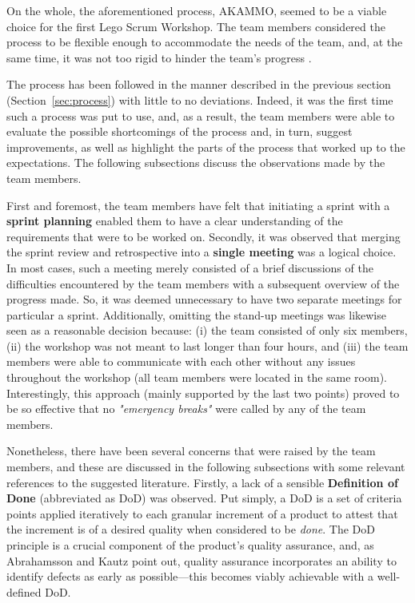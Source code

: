 \documentclass[conference]{IEEEtran}
\begin{document}
On the whole, the aforementioned process, {\selectfont AKAMMO},
seemed to be a viable choice for the first Lego Scrum Workshop. The team members
considered the process to be flexible enough to accommodate the needs of the
team, and, at the same time, it was not too rigid to hinder the team's progress
\cite{DIT348A2}.

The process has been followed in the manner described in the previous section
(Section~\ref{sec:process}) with little to no deviations. Indeed, it was the
first time such a process was put to use, and, as a result, the team members
were able to evaluate the possible shortcomings of the process and, in turn,
suggest improvements, as well as highlight the parts of the process that worked
up to the expectations. The following subsections discuss the observations made
by the team members.

First and foremost, the team members have felt that initiating a sprint with a 
\textbf{sprint planning} enabled them to have a clear understanding of the requirements
that were to be worked on. Secondly, it was observed that merging the sprint
review and retrospective into a \textbf{single meeting} was a logical choice. In most
cases, such a meeting merely consisted of a brief discussions of the difficulties
encountered by the team members with a subsequent overview of the progress made.
So, it was deemed unnecessary to have two separate meetings for particular a sprint.
Additionally, omitting the stand-up meetings was likewise seen as a reasonable
decision because: (i) the team consisted of only six members, (ii) the workshop
was not meant to last longer than four hours, and (iii) the team members were
able to communicate with each other without any issues throughout the workshop
(all team members were located in the same room). Interestingly, this approach
(mainly supported by the last two points) proved to be so effective that no
\textit{"emergency breaks"} were called by any of the team members.

Nonetheless, there have been several concerns that were raised by the team
members, and these are discussed in the following subsections with some
relevant references to the suggested literature. Firstly, a lack of a sensible
\textbf{Definition of Done} (abbreviated as DoD) was observed. Put simply, a
DoD is a set of criteria points applied iteratively to each granular increment
of a product to attest that the increment is of a desired quality
\cite{Kopczynska2022} when considered to be \textit{done}. The DoD principle is
a crucial component of the product's quality assurance, and, as Abrahamsson and
Kautz \cite{Abrahamsson2002} point out, quality assurance incorporates an
ability to identify defects as early as possible---this becomes viably
achievable with a well-defined DoD.
\end{document}
